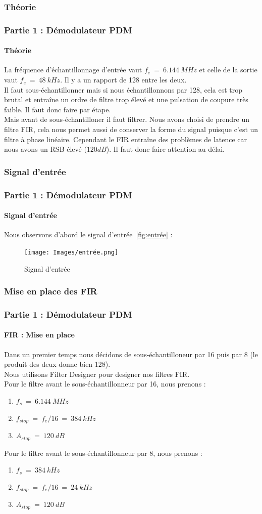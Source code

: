 \documentclass[
10pt,
aspectratio=169,
]{beamer}
\begin{document}
\subsubsection{Théorie}
\begin{frame} 
\frametitle{Partie 1 : Démodulateur PDM} 
\framesubtitle{Théorie} 
La fréquence d'échantillonnage d'entrée vaut $f_e~=~6.144~MHz$ et celle de la sortie vaut $f_e~=~48~kHz$. Il y a un rapport de 128 entre les deux.\\
Il faut sous-échantillonner mais si nous échantillonnons par 128, cela est trop brutal et entraîne un ordre de filtre trop élevé et une pulsation de coupure très faible. Il faut donc faire par étape. \\
Mais avant de sous-échantilloner il faut filtrer. Nous avons choisi de prendre un filtre FIR, cela nous permet aussi de conserver la forme du signal puisque c'est un filtre à phase linéaire. Cependant le FIR entraîne des problèmes de latence car nous avons un RSB élevé ($120 dB$). Il faut donc faire attention au délai.
\end{frame}

\subsubsection{Signal d'entrée}
\begin{frame}
\frametitle{Partie 1 : Démodulateur PDM} 
\framesubtitle{Signal d'entrée} 
Nous observons d'abord le signal d'entrée~\ref{fig:entrée} : 
\begin{figure}[h]
    \centering
    \texttt{[image: Images/entrée.png]}
    \caption{Signal d'entrée}
\end{figure}
\end{frame}

\subsubsection{Mise en place des FIR}
\begin{frame} 
\frametitle{Partie 1 : Démodulateur PDM} 
\framesubtitle{FIR : Mise en place} 
Dans un premier temps nous décidons de sous-échantilloneur par 16 puis par 8 (le produit des deux donne bien 128). \\
Nous utilisons Filter Designer pour designer nos filtres FIR.\\
Pour le filtre avant le sous-échantillonneur par 16, nous prenons : 
\begin{enumerate}
    \item $f_s~=~6.144~MHz$
    \item $f_{stop}~=~f_e/16~=~384~kHz$
    \item $A_{stop}~=~120~dB$
\end{enumerate}
\vspace*{0.7cm}
Pour le filtre avant le sous-échantillonneur par 8, nous prenons : 
\begin{enumerate}
    \item $f_s~=~384~kHz$
    \item $f_{stop}~=~f_e/16~=~24~kHz$
    \item $A_{stop}~=~120~dB$
\end{enumerate}
\end{frame}
\end{document}
